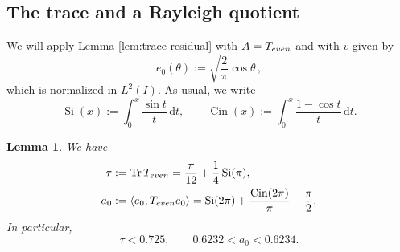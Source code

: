 \documentclass[10pt,a4paper]{amsart}
\newtheorem{lemma}[theorem]{Lemma}
\newcommand{\ip}[2]{\left\langle #1,#2\right\rangle}
\newcommand{\dd}{\,\mathrm{d}}
\newcommand{\Tr}{\operatorname{Tr}}
\begin{document}

\subsection*{The trace and a Rayleigh quotient}

We will apply Lemma \ref{lem:trace-residual} with $A=T_{\rm even}$ and with $v$ given by
\begin{equation}\label{eq:e0-def}
e_0(\theta):=\sqrt{\frac2\pi}\cos\theta \,,
\end{equation}
which is normalized in $L^2(I)$. As usual, we write
\[
\operatorname{Si}(x):=\int_0^x\frac{\sin t}{t}\dd t,
\qquad
\operatorname{Cin}(x):=\int_0^x\frac{1-\cos t}{t}\dd t.
\]




\begin{lemma}\label{lem:trace-and-rayleigh}
We have
\begin{align}
\tau&:= \Tr T_{\rm even} = \frac{\pi}{12}+\frac14\operatorname{Si}(\pi),
\label{eq:tau-exact}\\
a_0& :=\ip{e_0}{T_{\rm even}e_0}
=\operatorname{Si}(2\pi)
+\frac{\operatorname{Cin}(2\pi)}{\pi}-\frac\pi2.
\label{eq:a0-exact}
\end{align}
In particular,
\begin{equation}\label{eq:tau-a0-numerical}
\tau<0.725,
\qquad
0.6232<a_0<0.6234.
\end{equation}
\end{lemma}
\end{document}

